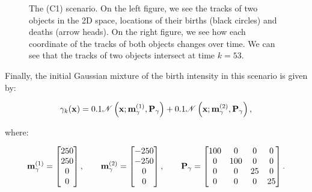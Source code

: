 \begin{figure}
\begin{subfigure}[]{0.48\linewidth}
\begin{subfigure}[b]{\linewidth}
        \end{subfigure}
    \end{subfigure}
  \caption[True tracks of objects in the (C1) scenario.]{The (C1) scenario. On the left figure, we see the tracks of two objects in the 2D space, locations of their births (black circles) and deaths (arrow heads). On the right figure, we see how each coordinate of the tracks of both objects changes over time. We can see that the tracks of two objects intersect at time $k=53$.}
  \label{fig:c1-scenario}
\end{figure}

Finally, the initial Gaussian mixture of the birth intensity in this scenario is given by:

\begin{equation}
    \gamma_k(\mathbf{x}) = 0.1 \mathscr{N}\left( \mathbf{x}; \svecat{m}{\gamma}{(1)}, \vecat{P}{\gamma} \right)
        + 0.1 \mathscr{N}\left( \mathbf{x}; \svecat{m}{\gamma}{(2)}, \vecat{P}{\gamma} \right),
\end{equation}

\noindent where:

\begin{equation}
    \svecat{m}{\gamma}{(1)} = \begin{bmatrix}
        250 \\
        250 \\
        0 \\
        0 \\
    \end{bmatrix},
    \qquad
    \svecat{m}{\gamma}{(2)} = \begin{bmatrix}
        -250 \\
        -250 \\
        0 \\
        0 \\
    \end{bmatrix},
    \qquad
    \vecat{P}{\gamma} = \begin{bmatrix}
        100 & 0     & 0     & 0     \\
        0   & 100   & 0     & 0     \\
        0   & 0     & 25    & 0     \\
        0   & 0     & 0     & 25    \\
    \end{bmatrix}.
\end{equation}
